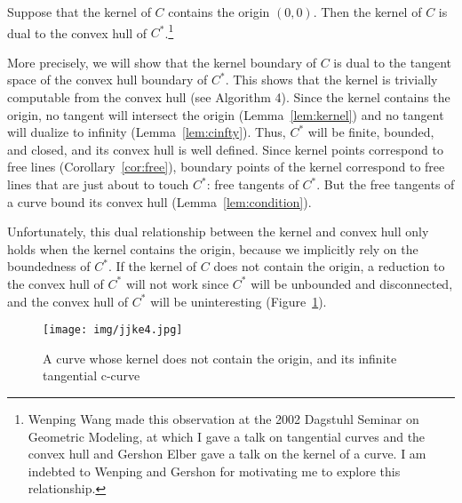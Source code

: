 \documentclass[12pt]{article}
\begin{document}
\begin{theorem}[Wang]
\label{thm:hullisdual}
Suppose that the kernel of $C$ contains the origin $(0,0)$.
Then the kernel of $C$ is dual to the convex hull of $C^*$.\footnote{Wenping Wang made this observation 
	at the 2002 Dagstuhl
	Seminar on Geometric Modeling, at which I gave 
	a talk on tangential curves and the convex hull
	and Gershon Elber gave a talk on the kernel of a curve.
	I am indebted to Wenping and Gershon for
	motivating me to explore this relationship.}
\end{theorem}
\prf
More precisely, we will show that the kernel boundary of $C$ is dual 
to the tangent space of the convex hull boundary of $C^*$.
This shows that the kernel is trivially computable from the convex hull
(see Algorithm 4).
Since the kernel contains the origin, no tangent will intersect the origin
(Lemma~\ref{lem:kernel}) and no tangent will dualize to infinity (Lemma~\ref{lem:cinfty}).
Thus, $C^*$ will be finite, bounded, and closed,
and its convex hull is well defined.
Since kernel points correspond to free lines (Corollary~\ref{cor:free}),
boundary points of the kernel correspond to 
free lines that are just about to touch $C^*$: free tangents of $C^*$.
But the free tangents of a curve bound its convex hull (Lemma~\ref{lem:condition}).
\QED


Unfortunately, this dual relationship between the kernel and convex hull 
only holds when the kernel contains the origin,
because we implicitly rely on the boundedness of $C^*$.
If the kernel of $C$ does not contain the origin, a reduction to the convex hull
of $C^*$ will not work since $C^*$ will be unbounded
and disconnected, and the convex hull of $C^*$
will be uninteresting (Figure~\ref{fig:originNotInKernel}).

\begin{figure}
\begin{center}
\texttt{[image: img/jjke4.jpg]}
\end{center}
\caption{A curve whose kernel does not contain the origin, and its infinite tangential c-curve}
\label{fig:originNotInKernel}
\end{figure}
\end{document}
